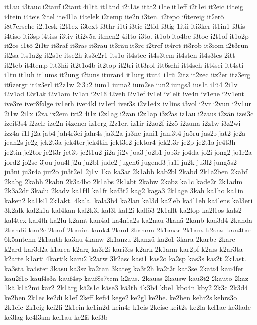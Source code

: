{it1au
i3tauc
i2tauf
i2taut
4i1tä
it1änd
i2t1äs
ität2
i1te
it1eff
i2t1ei
it2eic
i4teig
i4tein
i4teis
2itel
ite4l1a
i4telek
i2temp
ite2n
i3ten.
i2tepo
i6tereig
it2erö
i8t7ersche
i2t1esk
i2t1ex
i3text
i3thr
i1ti
i3tic
i2tid
i3tig
1itii
iti3ker
it1in1
i3tis
i4tiso
iti3sp
i4tiss
i3tiv
iti2v5a
itmen2
4i1to
i3to.
it1ob
ito4be
i3toc
i2t1of
it1o2p
it2os
i1tö
2i1tr
it3raf
it3ras
it3rau
it3räu
it3re
i2tref
it4ret
it3rob
it3rom
i2t3run
it2sa
its1a2g
it2s1e
itse2h
its3e2r1
its1o
it4stec
it4s3tem
it4sten
it4s3tes
2itt
it2teb
it4temp
itt3hä
it2t1o4b
it2top
it2tri
itt3rol
itt6schi
itt4seh
itt4sei
itt4sti
i1tu
it1uh
it1ums
it2ung
i2tuns
ituran4
it1urg
itut4
i1tü
2itz
it2zec
itz2er
itz3erg
it6zergr
it4z3erl
it2z1w
2i3u2
ium1
iuma2
ium2se
iun2
iungs3
ius1t
i1ü4
2i1v
i2v1ad
i2v1ak
i2v1am
iv1an
i2v1ä
i2veb
i2v1ef
iv1ei
iv1elt
ive4n
iv1ene
i2v1ent
ive3re
iver8folge
iv1erh
iver4kl
iv1erl
iver3s
i2v1e4x
iv1ins
i3vol
i2vr
i2vun
i2v1ur
2i1w
2i1x
i2xa
ix2em
ixt2
4i1z
i2z1ag
i2zan
i2z1ap
i3z2as
iz1au
i2zaus
i2zän
izei3c
izeit3s4
i2zele
ize2n
i4zener
iz1erg
i2z1erl
iz1ir
i2zo2f
i2zö
i2zuna
i2z1w
i3z2wi
izz4a
í1l
j2a
jab4
jah4r3ei
jahr4s
ja3l2a
ja3ne
jani1
jani3t4
ja5ru
jas2o
jat2
je2a
jean2s
je2g
jek2t3a
jek4ter
jek4tin
jekt3o2
jektor4
jek2t3r
je2p
je2t1a
je4t3h
je2tin
je2tor
je2t3r
jet3t
je2t1u2
ji2a
ji2v
joa3
jo2b1
job3r
jo4da
jo2i
jong2
jo1r2a
jord2
jo2sc
3jou
jou4l
j2u
ju2bl
jude2
jugen6
jugend3
ju1i
ju2k
ju3l2
jung5s2
ju3ni
ju3r4a
jur2o
ju3t2e1
2j1v
1ka
ka3ar
2k1abb
kab2bl
2kabd
2k1a2ben
2kabf
2kabg
2kabh
2kabn
2k3a4bo
2k1abs
2k1abt
2kabw
2kabz
ka1c
kade2r
2k1adm
2k3a2dr
3kadu
2kadv
ka1f4l
ka1fr
kaf3t2
kag2
kaga3
2k1age
3kah
ka1ho
ka1in
kaken2
ka1k4l
2k1akt.
4kala.
kala3b4
ka2lan
kal3d
ka2leb
ka4l1eh
ka4lens
kal3eri
3k2alk
kal2k1a
kal4kan
kal2k3l
kal3l
kall2i
kallö3
2k1allt
ka2lop
ka2l1os
kals2
kal4tex
kal4th
ka2lu
k2amt
kan4al
ka4n1a2s
ka2nau
3kanä
2kanb
kan3d4
2kanda
2kandä
kan2e
2kanf
2kanim
kank4
2kanl
2kanom
2k1anor
2k1ans
k2ans.
kan4tar
6k5antenn
2k1anth
ka3nu
4kanw
2k1anzu
2kanzü
ka2o1
3kara
2karbe
2karc
k2ard
kar3d2a
k1area
k2arg
ka3r2i
kari3es
k2ark
2k1arm
kar2pf
k2ars
k2ar3ta
k2arte
k1arti
4kartik
karu2
k2arw
3k2asc
kasi1
kas2o
ka2sp
kas3s
kas2t
2k1ast.
ka3sta
ka4ster
3kasu
ka3sz
ka2tan
3kateg
ka3t2h
ka2t3r
kat3se
2katt4
kau4fer
kau2f1o
kauf4s3a
kauf4sp
kauf8s7tem
k2aus.
2kauss
2kausw
kau3t2
2kauto
2kaz
1kä
k1ä2mi
kär2
2k1ärg
kä2s1c
käse3
kä3th
4k3b4
kbe1
kbo4n
kby2
2k3c
2k3d4
ke2ben
2k1ec
ke2di
k1ef
2keff
kefi4
kege2
ke2gl
ke2he.
ke2hen
kehr2s
kehrs3o
2k1eic
2k1eig
kei2li
2k1ein
ke1in2d
kein4e
k1eis
2keise
keit2s
ke2la
kel1ac
ke3lade
ke3lag
ke4l3am
kel1au
ke2lä
kel3b
}
